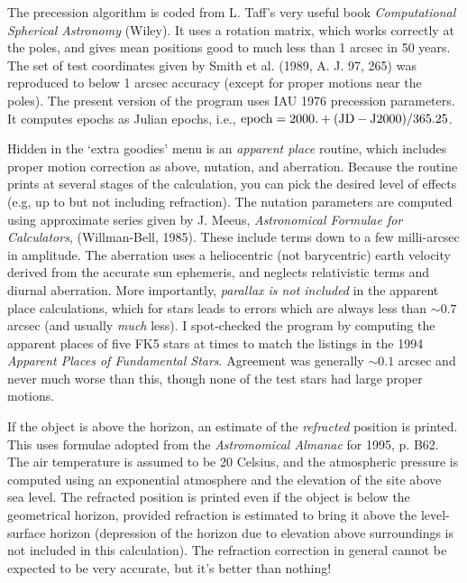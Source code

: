 The precession algorithm is coded from L. Taff's very 
useful book {\it Computational Spherical Astronomy} (Wiley).  It uses
a rotation matrix, which works correctly at the poles,
and gives mean positions good to much less than
1 arcsec in 50 years.
The set of test coordinates given by Smith et al. 
(1989, A. J. 97, 265) was reproduced to below 1 arcsec accuracy 
(except for proper motions near the poles).  The present version of the 
program uses IAU 1976 precession parameters.  It computes epochs as
Julian epochs, i.e., 
$\hbox{epoch} = 2000. + ({\rm JD - J2000}) / 365.25$.
\par
Hidden in the `extra goodies' menu is an {\it apparent place} routine,
which includes proper motion correction as above, nutation, and
aberration.  Because the routine prints at several stages of the
calculation, you can pick the desired level of effects (e.g, up to
but not including refraction).  
The nutation parameters are computed using approximate
series given by J. Meeus, {\it Astronomical Formulae for Calculators},
(Willman-Bell, 1985).  These include terms down to a few milli-arcsec
in amplitude.  The aberration uses a heliocentric (not barycentric) 
earth velocity derived from the accurate sun ephemeris, and neglects
relativistic terms and diurnal aberration.  
More importantly, {\it parallax is not
included} in the apparent place calculations, which for stars
leads to errors which are always less than $\sim 0.7$ arcsec
(and usually {\it much} less).  I spot-checked the program by 
computing the apparent places of five FK5 stars at times to match
the listings in  the 1994 
{\it Apparent Places of Fundamental Stars}. 
Agreement was generally $\sim 0.1$ arcsec and never much worse than
this, though none of the
test stars had large proper motions.  

If the object is above the
horizon, an estimate of the {\it refracted} position
is printed.  This uses formulae adopted from the {\it Astromomical Almanac}
for 1995, p. B62.  The air temperature is assumed to be 
20 Celsius, and the 
atmospheric pressure is computed using an exponential
atmosphere and the elevation of the site above sea level.  The refracted
position is printed even if the object is below the geometrical 
horizon, provided refraction is estimated to bring it above the 
level-surface horizon (depression of the horizon due to elevation
above surroundings is not included in this calculation). 
The refraction correction in general
cannot be expected to be very accurate, but it's better than nothing!

